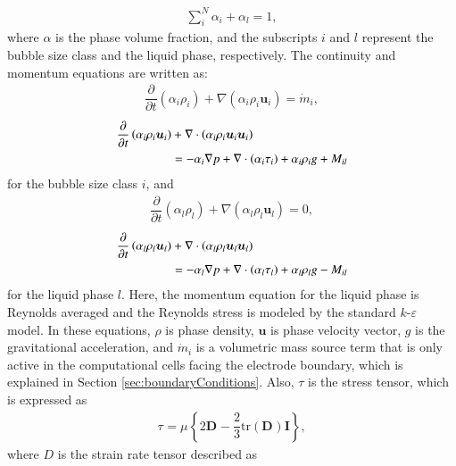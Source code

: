 \documentclass[3p, twocolumn, 10pt]{elsarticle}
\begin{document}
\begin{align}\label{eq:alphasum}
  \sum_{i}^N\alpha_{i} + \alpha_{l}=1,
\end{align}
where $\alpha$ is the phase volume fraction, and the subscripts $i$ and $l$ represent the bubble size class and the liquid phase, respectively.
The continuity and momentum equations are written as:
\begin{align}\label{eq:continuity_i}
  \dfrac{\partial}{\partial t}
  \left(
  \alpha_{i}\rho_{i}
  \right)+
  \nabla
  \left(
  \alpha_{i}\rho_{i}\bm{u}_{i}
  \right)=
  \dot{m}_{i},
\end{align}
\begin{align}
    \dfrac{\partial}{\partial t}
    \left(
    \alpha_{i}
    \rho_{i}\bm{u}_{i}
    \right)&+
    \nabla\cdot
    \left(
    \alpha_{i}\rho_{ i}\bm{u}_{i}\bm{u}_{i}
    \right)\notag \\
    &=
    -\alpha_{i}\nabla p +
    \nabla\cdot
    \left(
    \alpha_{i}\tau_{i}
    \right)
    +
    \alpha_{i}\rho_{i}g
    +M_{il}
\end{align}
for the bubble size class $i$, and
\begin{align}
  \dfrac{\partial}{\partial t}
  \left(
  \alpha_{l}\rho_{l}
  \right)+
  \nabla
  \left(
  \alpha_{l}\rho_{l}\bm{u}_{l}
  \right)=0,
\end{align}
\begin{align}
  \dfrac{\partial}{\partial t}
  \left(
  \alpha_{l}\rho_{l}\bm{u}_{l}
  \right)&+
  \nabla\cdot
  \left(
  \alpha_{l}\rho_{ l}\bm{u}_{l}\bm{u}_{l}
  \right)\notag \\
  &=
  -\alpha_{l}\nabla p +
  \nabla\cdot
  \left(
  \alpha_{l}\tau_{l}
  \right)
  +
  \alpha_{l}\rho_{l}g
  -M_{il}
\end{align}
for the liquid phase $l$.
Here, the momentum equation for the liquid phase is Reynolds averaged and the Reynolds stress is modeled by the standard $k$-$\varepsilon$ model.
In these equations, $\rho$ is phase density, $\bm{u}$ is phase velocity vector, $g$ is the gravitational acceleration, and $\dot{m}_i$ is a volumetric mass source term that is only active in the computational cells facing the electrode boundary, which is explained in Section \ref{sec:boundaryConditions}. 
Also, $\tau$ is the stress tensor, which is expressed as
\begin{align}
  \tau_{} = \mu_{}^\mathrm{}
  \left\{
  2\bm{D}_{}-
  \dfrac{2}{3}
  \mathrm{tr}
  \left(\bm{D}_{}\right)\bm{I}
  \right\},
\end{align}
where $D$ is the strain rate tensor described as
\end{document}
